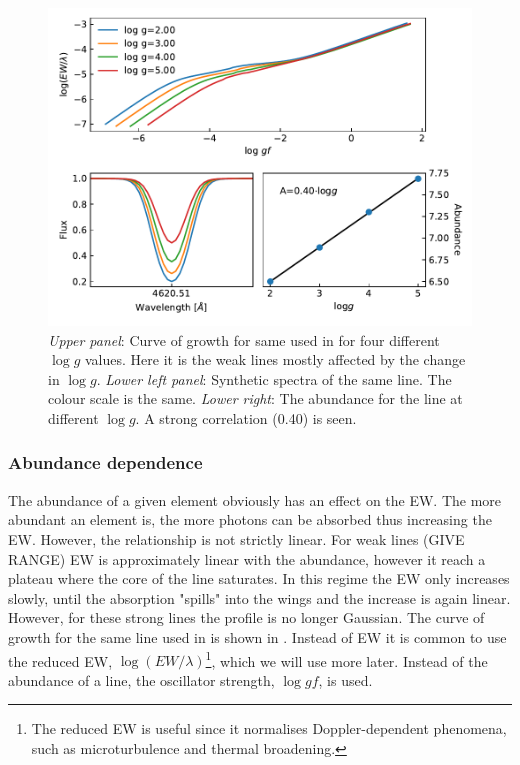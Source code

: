 \begin{figure}[htpb!]
    \centering
    \includegraphics[width=0.85\linewidth]{figures/ewGravity.pdf}
    \caption{\emph{Upper panel}: Curve of growth for same  used in  for
                                 four different $\log g$ values. Here it is the weak lines mostly
                                 affected by the change in $\log g$.
             \emph{Lower left panel}: Synthetic spectra of the same line. The colour scale is the
                                      same.
             \emph{Lower right}: The abundance for the line at different $\log g$. A strong
                                 correlation (0.40) is seen.}
    \label{fig:ewGravity}
\end{figure}




\subsubsection{Abundance dependence}

The abundance of a given element obviously has an effect on the EW. The more abundant an element is,
the more photons can be absorbed thus increasing the EW. However, the relationship is not strictly
linear. For weak lines (GIVE RANGE) EW is approximately linear with the abundance, however it reach
a plateau where the core of the line saturates. In this regime the EW only increases slowly, until
the absorption "spills" into the wings and the increase is again linear. However, for these strong
lines the profile is no longer Gaussian. The curve of growth for the same  line used in
 is shown in . Instead of EW it is common to use the reduced EW,
$\log (EW/\lambda)$\footnote{The reduced EW is useful since it normalises Doppler-dependent
phenomena, such as microturbulence and thermal broadening.}, which we will use more later. Instead
of the abundance of a line, the oscillator strength, $\log \mathit{gf}$, is used.

